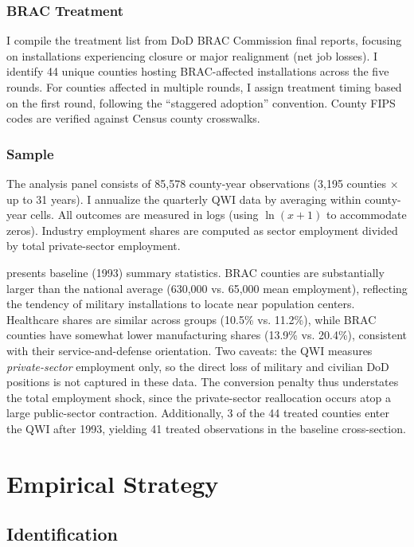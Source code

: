\documentclass[12pt]{article}
\begin{document}
\subsubsection*{BRAC Treatment} I compile the treatment list from DoD BRAC Commission final reports, focusing on installations experiencing closure or major realignment (net job losses). I identify 44 unique counties hosting BRAC-affected installations across the five rounds. For counties affected in multiple rounds, I assign treatment timing based on the first round, following the ``staggered adoption'' convention. County FIPS codes are verified against Census county crosswalks.

\subsubsection*{Sample} The analysis panel consists of 85,578 county-year observations (3,195 counties $\times$ up to 31 years). I annualize the quarterly QWI data by averaging within county-year cells. All outcomes are measured in logs (using $\ln(x+1)$ to accommodate zeros). Industry employment shares are computed as sector employment divided by total private-sector employment.



 presents baseline (1993) summary statistics. BRAC counties are substantially larger than the national average (630,000 vs. 65,000 mean employment), reflecting the tendency of military installations to locate near population centers. Healthcare shares are similar across groups (10.5\% vs. 11.2\%), while BRAC counties have somewhat lower manufacturing shares (13.9\% vs. 20.4\%), consistent with their service-and-defense orientation. Two caveats: the QWI measures \textit{private-sector} employment only, so the direct loss of military and civilian DoD positions is not captured in these data. The conversion penalty thus understates the total employment shock, since the private-sector reallocation occurs atop a large public-sector contraction. Additionally, 3 of the 44 treated counties enter the QWI after 1993, yielding 41 treated observations in the baseline cross-section.

\section{Empirical Strategy}

\subsection{Identification}
\end{document}

